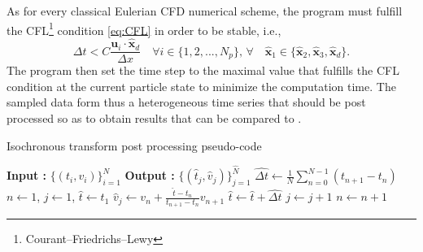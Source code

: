 As for every classical Eulerian CFD numerical scheme, the program must fulfill the CFL\footnote{Courant–Friedrichs–Lewy} condition \eqref{eq:CFL} in order to be stable, i.e., 
\begin{equation}
	\Delta t < C\frac{\textbf{u}_i\cdot \hat{\textbf{x}}_d}{\Delta x} \quad \forall i\in\{1,2,...,N_p\},\,\forall \quad \hat{\textbf{x}}_1\in\{\hat{\textbf{x}}_2,\hat{\textbf{x}}_3,\hat{\textbf{x}}_d\}.
	\label{eq:CFL}
\end{equation}
The program then set the time step to the maximal value that fulfills the CFL condition at the current particle state to minimize the computation time. 
The sampled data form thus a heterogeneous time series that should be post processed so as to obtain results that can be compared to \citet{Meyer2016}.

\begin{algorithm}
	\caption{Isochronous transform post processing pseudo-code }
	\label{alg:isochronous}
	\begin{algorithmic}
		\State \textbf{Input :} $\{(t_i,v_i)\}_{i=1}^N$
		\State \textbf{Output :} $\{(\hat{t}_j,\hat{v}_j)\}_{j=1}^{\hat{N}}$
		\State $\hat{\Delta t} \gets \frac{1}{N}\sum_{n=0}^{N-1}(t_{n+1}-t_{n})$
		\State $n \gets 1$, $j \gets 1$, $\hat{t} \gets t_1$
		\State $\hat{v}_j \gets v_n + \frac{\hat{t}-t_n}{t_{n+1}-t_n} v_{n+1}$
		\State $\hat{t}\gets \hat{t} + \hat{\Delta t}$
		\State $j \gets j + 1$
		\EndWhile
		\State $n\gets n+1$
		\EndWhile
	\end{algorithmic}
\end{algorithm}

